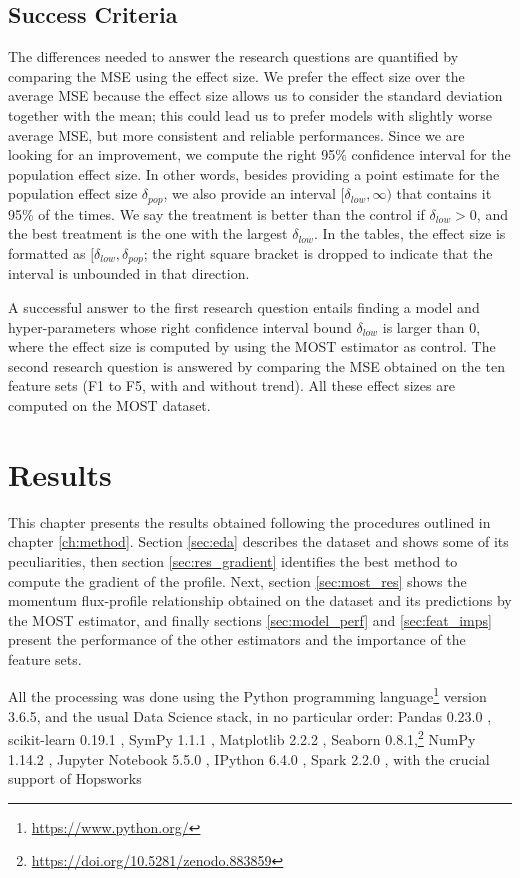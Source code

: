 \documentclass[a4paper,11pt]{kth-mag}
\begin{document}
\section{Success Criteria}
\label{sec:success}
The differences needed to answer the research questions are quantified by comparing the MSE using the effect size. We prefer the effect size over the average MSE because the effect size allows us to consider the standard deviation together with the mean; this could lead us to prefer models with slightly worse average MSE, but more consistent and reliable performances. Since we are looking for an improvement, we compute the right 95\% confidence interval for the population effect size. In other words, besides providing a point estimate for the population effect size $\delta_{pop}$, we also provide an interval $[\delta_{low}, \infty)$ that contains it 95\% of the times. We say the treatment is better than the control if $\delta_{low}>0$, and the best treatment is the one with the largest $\delta_{low}$. In the tables, the effect size is formatted as $[\delta_{low},\delta_{pop}$; the right square bracket is dropped to indicate that the interval is unbounded in that direction.

A successful answer to the first research question entails finding a model and hyper-parameters whose right confidence interval bound $\delta_{low}$ is larger than 0, where the effect size is computed by using the MOST estimator as control. The second research question is answered by comparing the MSE obtained on the ten feature sets (F1 to F5, with and without trend). All these effect sizes are computed on the MOST dataset.


\chapter{Results}
\label{ch:results}

This chapter presents the results obtained following the procedures outlined in chapter \ref{ch:method}. Section \ref{sec:eda} describes the dataset and shows some of its peculiarities, then section \ref{sec:res_gradient} identifies the best method to compute the gradient of the profile. Next, section \ref{sec:most_res} shows the momentum flux-profile relationship obtained on the dataset and its predictions by the MOST estimator, and finally sections \ref{sec:model_perf} and \ref{sec:feat_imps} present the performance of the other estimators and the importance of the feature sets.

All the processing was done using the Python programming language\footnote{\url{https://www.python.org/}} version 3.6.5, and the usual Data Science stack, in no particular order: Pandas 0.23.0 \citep{pandas}, scikit-learn 0.19.1 \citep{sklearn}, SymPy 1.1.1 \citep{sympy}, Matplotlib 2.2.2 \citep{matplotlib}, Seaborn 0.8.1,\footnote{\url{https://doi.org/10.5281/zenodo.883859}} NumPy 1.14.2 \citep{numpy}, Jupyter Notebook 5.5.0 \citep{jupyter}, IPython 6.4.0 \citep{ipython}, Spark 2.2.0 \citep{spark}, with the crucial support of Hopsworks \citep{hops}
\end{document}
